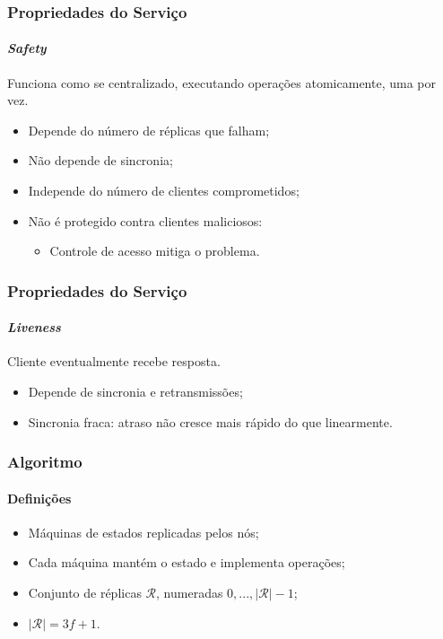 \documentclass{beamer}
\begin{document}
\begin{frame}
  \frametitle{Propriedades do Serviço}
  \framesubtitle{\textit{Safety}}

  Funciona como se centralizado, executando operações atomicamente, uma por vez.
  \begin{itemize}
    \item
      Depende do número de réplicas que falham;

    \item
      Não depende de sincronia;

    \item
      Independe do número de clientes comprometidos;

    \item
      Não é protegido contra clientes maliciosos:
      \begin{itemize}
        \item
          Controle de acesso mitiga o problema.
      \end{itemize}
  \end{itemize}
\end{frame}

\begin{frame}
  \frametitle{Propriedades do Serviço}
  \framesubtitle{\textit{Liveness}}

  Cliente eventualmente recebe resposta.
  \begin{itemize}
    \item
      Depende de sincronia e retransmissões;
      
    \item
      Sincronia fraca: atraso não cresce mais rápido do que linearmente.
  \end{itemize}
\end{frame}

\begin{frame}
  \frametitle{Algoritmo}
  \framesubtitle{Definições}

  \begin{itemize}
    \item
      Máquinas de estados replicadas pelos nós;

    \item
      Cada máquina mantém o estado e implementa operações;

    \item
      Conjunto de réplicas $\mathcal{R}$, numeradas $0, ..., |\mathcal{R}| - 1$;

    \item
      $|\mathcal{R}| = 3f + 1$.
  \end{itemize}
\end{frame}
\end{document}
